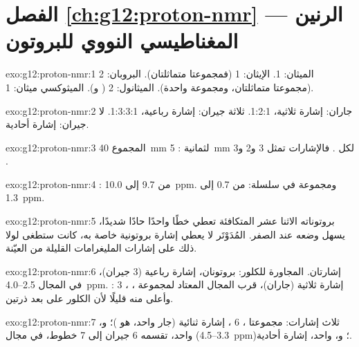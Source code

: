 \section*{الفصل \ref{ch:g12:proton-nmr} --- الرنين المغناطيسي النووي للبروتون}

\begin{solution}{exo:g12:proton-nmr:1}
الميثان: 1. الإيثان: 1 (فمجموعتا  متماثلتان). البروبان: 2 (مجموعتا
 متماثلتان، ومجموعة  واحدة). الميثانول: 2 ( و).
الميثوكسي ميثان: 1.
\end{solution}

\begin{solution}{exo:g12:proton-nmr:2}
جاران: إشارة ثلاثية، 1:2:1. ثلاثة جيران: إشارة رباعية، 1:3:3:1.
لا جيران: إشارة أحادية.
\end{solution}

\begin{solution}{exo:g12:proton-nmr:3}
المجموع \qty{40}{mm} لثمانية : \qty{5}{mm} لكل . فالإشارات
تمثل 3 و2 و3 .
\end{solution}

\begin{solution}{exo:g12:proton-nmr:4}
: من 9.7 إلى \qty{10.0}{ppm}. ومجموعة  في سلسلة: من 0.7 إلى
\qty{1.3}{ppm}.
\end{solution}

\begin{solution}{exo:g12:proton-nmr:5}
بروتوناته الاثنا عشر المتكافئة تعطي خطًا واحدًا حادًا شديدًا، يسهل
وضعه عند الصفر.  المُدَوْتَر لا يعطي إشارة بروتونية خاصة
به، كانت ستطغى لولا ذلك على إشارات المليغرامات القليلة من العيّنة.
\end{solution}

\begin{solution}{exo:g12:proton-nmr:6}
إشارتان.  المجاورة للكلور: بروتونان، إشارة رباعية (3
جيران)، في المجال 2.5--\qty{4.0}{ppm}. : 3 ، إشارة
ثلاثية (جاران)، قرب المجال المعتاد لمجموعة ، وأعلى منه قليلًا
لأن الكلور على بعد ذرتين.
\end{solution}

\begin{solution}{exo:g12:proton-nmr:7}
ثلاث إشارات: مجموعتا ، 6 ، إشارة ثنائية (جار
واحد، هو )؛ و،  واحد، تقسمه 6 جيران
إلى 7 خطوط، في مجال  (3.3--\qty{4.5}{ppm})؛
و،  واحد، إشارة أحادية.
\end{solution}

